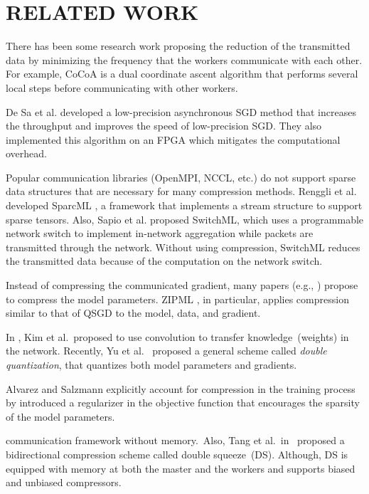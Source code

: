 \chapter{RELATED WORK}

There has been some research work proposing the reduction of the transmitted data by minimizing the frequency that the workers communicate with each other. 
For example, CoCoA \cite{NIPS2014_5599} is a dual coordinate ascent algorithm that performs several local steps before communicating with other workers. 

De Sa et al. \cite{de2017understanding} developed a low-precision asynchronous SGD method that increases the throughput and improves the speed of low-precision SGD.
They also implemented this algorithm on an FPGA which mitigates the computational overhead.

Popular communication libraries (OpenMPI, NCCL, etc.) do not support sparse data structures that are necessary for many compression methods. Renggli et al. developed SparcML \cite{sparcml}, a framework that implements a stream structure to support sparse tensors.
Also, Sapio et al. \cite{SwitchML} proposed SwitchML, which uses a programmable network switch to implement in-network aggregation while packets are transmitted through the network. 
Without using compression, SwitchML reduces the transmitted data because of the computation on the network switch.

Instead of compressing the communicated gradient, many papers (e.g., \cite{AnwarHS15, Courbariaux_2015, Lin:2016:FPQ:3045390.3045690,zipml})  propose to compress the model parameters. 
ZIPML \cite{zipml}, in particular, applies compression similar to that of QSGD to the model, data, and gradient.

In \cite{Kim2018}, Kim et al.\ proposed to use convolution to transfer knowledge~(weights) in the network. 
Recently, Yu et al.\ \cite{yu2018double} proposed a general scheme called \emph{double quantization}, that quantizes both model parameters and gradients. 

Alvarez and Salzmann \cite{NIPS2017_6687}
explicitly account for compression in the training process by 
introduced a regularizer in the objective function that encourages the sparsity of the model parameters.  

communication framework without memory.~Also, Tang et al.\ in~\cite{tang2019doublesqueeze} proposed a bidirectional compression scheme called double squeeze~(DS). Although, DS is equipped with memory at both the master and the workers and supports biased and unbiased compressors.


